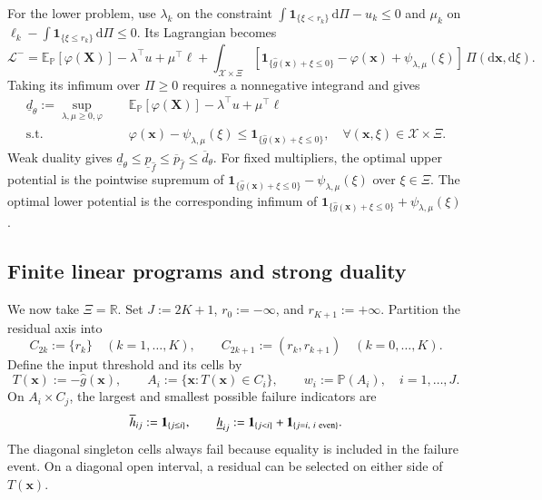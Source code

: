 \documentclass[review,11pt,3p,authoryear,nopreprintline]{elsarticle}
\begin{document}
For the lower problem, use $\lambda_k$ on the constraint
$\int\mathbf1_{\{\xi<r_k\}}\,\mathrm d\Pi-u_k\le0$ and $\mu_k$ on
$\ell_k-\int\mathbf1_{\{\xi\le r_k\}}\,\mathrm d\Pi\le0$. Its Lagrangian becomes
\[
  \mathcal L^-
  =
  \mathbb E_{\mathbb P}[\varphi(\bm X)]
  -\lambda^\top u+\mu^\top\ell
  +\int_{\mathcal X\times\Xi}
  \left[\mathbf1_{\{\hat g(\bm x)+\xi\le0\}}-\varphi(\bm x)
  +\psi_{\lambda,\mu}(\xi)\right]\,\Pi(\mathrm d\bm x,\mathrm d\xi).
\]
Taking its infimum over $\Pi\ge0$ requires a nonnegative integrand and gives
\begin{equation}
  \begin{aligned}
    \underline d_\theta:=\sup_{\lambda,\mu\ge0,\varphi}\quad&
    \mathbb E_{\mathbb P}[\varphi(\bm X)]
    -\lambda^\top u+\mu^\top\ell\\
    \text{s.t.}\quad&
    \varphi(\bm x)-\psi_{\lambda,\mu}(\xi)
    \le\mathbf1_{\{\hat g(\bm x)+\xi\le0\}},
    \quad\forall(\bm x,\xi)\in\mathcal X\times\Xi.
  \end{aligned}
  \label{eq-lower-measure-dual}
\end{equation}
Weak duality gives
$\underline d_\theta\le\underline p_{\hat f}\le\overline p_{\hat f}\le\overline d_\theta$.
For fixed multipliers, the optimal upper potential is the pointwise supremum of
$\mathbf1_{\{\hat g(\bm x)+\xi\le0\}}-\psi_{\lambda,\mu}(\xi)$ over $\xi\in\Xi$.
The optimal lower potential is the corresponding infimum of
$\mathbf1_{\{\hat g(\bm x)+\xi\le0\}}+\psi_{\lambda,\mu}(\xi)$.

\subsection{Finite linear programs and strong duality}
\label{subsec-finite-duality}

We now take $\Xi=\mathbb R$. Set $J:=2K+1$, $r_0:=-\infty$, and $r_{K+1}:=+\infty$. Partition the residual axis into
\begin{equation}
  C_{2k}:=\{r_k\}\quad(k=1,\ldots,K),
  \qquad
  C_{2k+1}:=(r_k,r_{k+1})\quad(k=0,\ldots,K).
  \label{eq-residual-cells}
\end{equation}
Define the input threshold and its cells by
\begin{equation}
  T(\bm x):=-\hat g(\bm x),\qquad
  A_i:=\{\bm x:T(\bm x)\in C_i\},\qquad
  w_i:=\mathbb P(A_i),\quad i=1,\ldots,J.
  \label{eq-input-cells}
\end{equation}
On $A_i\times C_j$, the largest and smallest possible failure indicators are
\begin{equation}
  \overline h_{ij}:=\mathbf1_{\{j\le i\}},
  \qquad
  \underline h_{ij}:=\mathbf1_{\{j<i\}}
  +\mathbf1_{\{j=i,\ i\ {\rm even}\}}.
  \label{eq-cell-costs}
\end{equation}
The diagonal singleton cells always fail because equality is included in the failure event. On a diagonal open interval, a residual can be selected on either side of $T(\bm x)$.
\end{document}
